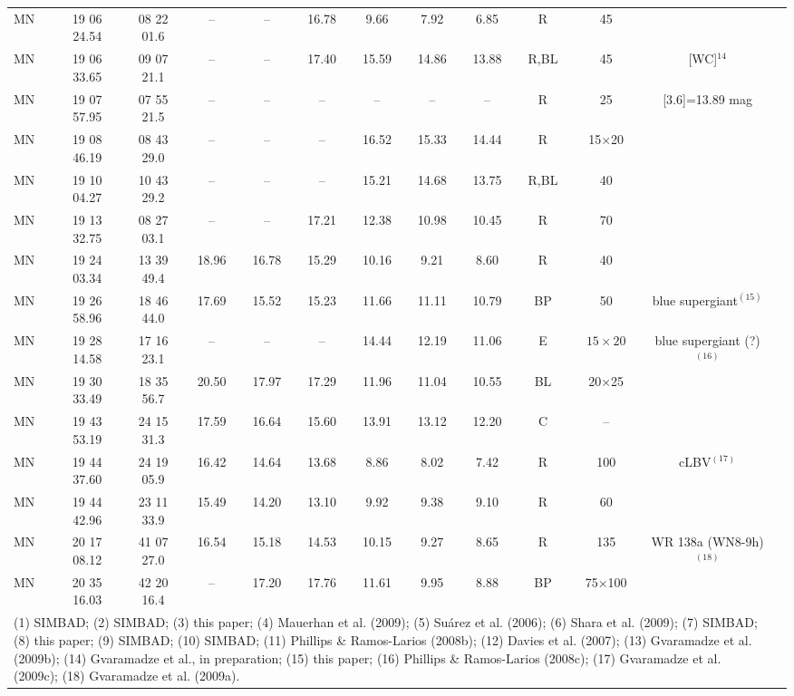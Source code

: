 \documentclass[useAMS]{mn2e}
\newcounter{qub}
\newcommand{\qq}{\addtocounter{qub}{1}\arabic{qub}}
\begin{document}
\begin{table*}
\begin{tabular}{lcccccccccccc}
MN\qq & 19 06 24.54 & 08 22 01.6 & -- & -- & 16.78 & 9.66 & 7.92 & 6.85 & R & 45 &  \\
MN\qq & 19 06 33.65 & 09 07 21.1 & -- & -- & 17.40 & 15.59 & 14.86 & 13.88 & R,BL & 45 & [WC]$^{14}$ \\
MN\qq & 19 07 57.95 & 07 55 21.5 & -- & -- & -- & -- & -- & -- & R & 25 & [3.6]=13.89 mag \\
MN\qq & 19 08 46.19 & 08 43 29.0 & -- & -- & -- & 16.52 & 15.33 & 14.44 & R & 15$\times$20 &  \\
MN\qq & 19 10 04.27 & 10 43 29.2 & -- & -- & -- & 15.21 & 14.68 & 13.75 & R,BL & 40 &  \\
MN\qq & 19 13 32.75 & 08 27 03.1 & -- & -- & 17.21 & 12.38 & 10.98 & 10.45 & R & 70 &  \\
MN\qq & 19 24 03.34 & 13 39 49.4 & 18.96 & 16.78 & 15.29 & 10.16 & 9.21 & 8.60 & R & 40 &  \\
MN\qq & 19 26 58.96 & 18 46 44.0 & 17.69 & 15.52 & 15.23 & 11.66 & 11.11 & 10.79 & BP & 50 & blue supergiant$^{(15)}$ \\
MN\qq & 19 28 14.58 & 17 16 23.1 & -- & -- & -- & 14.44 & 12.19 & 11.06 & E & $15\times20$ & blue supergiant (?)$^{(16)}$ \\
MN\qq & 19 30 33.49 & 18 35 56.7 & 20.50 & 17.97 & 17.29 & 11.96 & 11.04 & 10.55 & BL & 20$\times$25 &  \\
MN\qq & 19 43 53.19 & 24 15 31.3 & 17.59  & 16.64 & 15.60 & 13.91 & 13.12 & 12.20 & C & -- &  \\
MN\qq & 19 44 37.60 & 24 19 05.9 & 16.42 & 14.64 & 13.68 & 8.86 & 8.02 & 7.42 & R & 100 & cLBV$^{(17)}$ \\
MN\qq & 19 44 42.96 & 23 11 33.9 & 15.49 & 14.20 & 13.10 & 9.92 & 9.38 & 9.10 & R & 60 &  \\
MN\qq & 20 17 08.12 & 41 07 27.0 & 16.54 & 15.18 & 14.53 & 10.15 & 9.27 & 8.65 & R & 135 & WR 138a (WN8-9h)$^{(18)}$ \\
MN\qq & 20 35 16.03 & 42 20 16.4 & -- & 17.20 & 17.76 & 11.61 & 9.95 & 8.88 & BP & 75$\times$100 & \\
\hline
\multicolumn{12}{p{18cm}}{%
(1) SIMBAD; (2) SIMBAD; (3) this paper; (4) Mauerhan et al. (2009); (5) Su\'{a}rez et al. (2006); (6) Shara et al. (2009); (7) SIMBAD;
(8) this paper; (9) SIMBAD; (10) SIMBAD; (11) Phillips \& Ramos-Larios (2008b); (12) Davies et al. (2007); (13) Gvaramadze et al.
(2009b); (14) Gvaramadze et al., in preparation; (15) this paper; (16) Phillips \& Ramos-Larios (2008c); (17) Gvaramadze
et al. (2009c); (18) Gvaramadze et al. (2009a). }
\end{tabular}
\end{table*}
%
\end{document}
